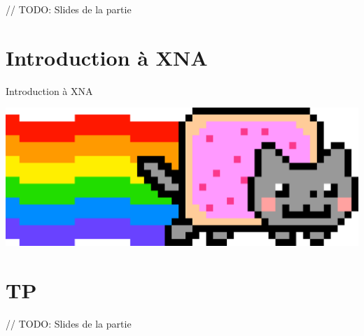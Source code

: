 \documentclass[12pt]{beamer}
\begin{document}
\begin{frame}
    // TODO: Slides de la partie
\end{frame}

\section{Introduction à XNA}

\begin{frame}
    \begin{center}
        \vspace{1cm}
        
        {\LARGE Introduction à XNA} \\

        \vspace{0.5cm}

        \includegraphics[scale=0.02]{img/nyancat.png}
    \end{center}
\end{frame}

\section{TP}

\begin{frame}
    // TODO: Slides de la partie
\end{frame}
\end{document}
